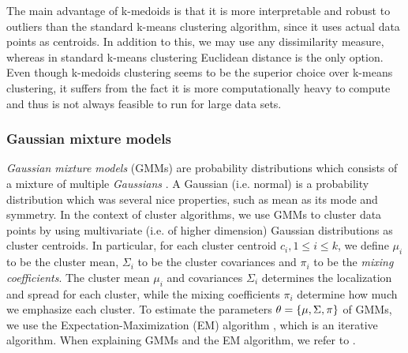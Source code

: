 The main advantage of k-medoids is that it is more interpretable and robust to outliers than the standard k-means clustering algorithm, since it uses actual data points as centroids. In addition to this, we may use any dissimilarity measure, whereas in standard k-means clustering Euclidean distance is the only option. Even though k-medoids clustering seems to be the superior choice over k-means clustering, it suffers from the fact it is more computationally heavy to compute and thus is not always feasible to run for large data sets.

\subsubsection{Gaussian mixture models}
\label{sec:gmm-clustering}
\textit{Gaussian mixture models} (GMMs) are probability distributions which consists of a mixture of multiple \textit{Gaussians} \cite[Section 9.2]{bishop2006}. A Gaussian (i.e. normal) is a probability distribution which was several nice properties, such as mean as its mode and symmetry. In the context of cluster algorithms, we use GMMs to cluster data points by using multivariate (i.e. of higher dimension) Gaussian distributions as cluster centroids. In particular, for each cluster centroid $c_i, 1 \leq i \leq k$, we define $\mu_i$ to be the cluster mean, $\Sigma_i$ to be the cluster covariances and $\pi_i$ to be the \textit{mixing coefficients}. The cluster mean $\mu_i$ and covariances $\Sigma_i$ determines the localization and spread for each cluster, while the mixing coefficients $\pi_i$ determine how much we emphasize each cluster. To estimate the parameters $\theta = \left\{\mu, \Sigma, \pi\right\}$ of GMMs, we use the Expectation-Maximization (EM) algorithm , which is an iterative algorithm. When explaining GMMs and the EM algorithm, we refer to \cite[Section 9.2]{bishop2006}.

